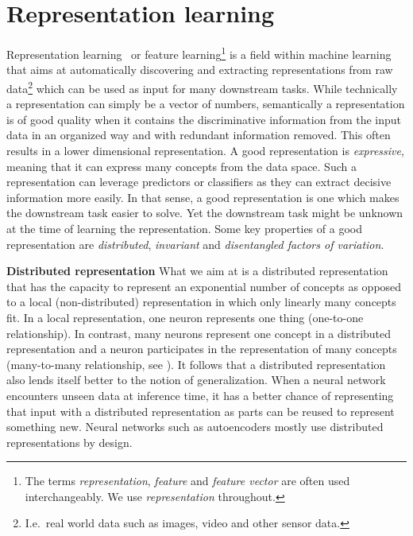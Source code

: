 \documentclass[a4paper,12pt]{report}
\begin{document}


\section{Representation learning}
Representation learning~\cite{ReprLearning} or feature learning\footnote{The terms \textit{representation}, \textit{feature} and \textit{feature vector} are often used interchangeably. We use \textit{representation} throughout.} is a field within machine learning that aims at automatically discovering and extracting representations from raw data\footnote{I.e.\ real world data such as images, video and other sensor data.} which can be used as input for many downstream tasks. While technically a representation can simply be a vector of numbers, semantically a representation is of good quality when it contains the discriminative information from the input data in an organized way and with redundant information removed. This often results in a lower dimensional representation. A good representation is \textit{expressive}, meaning that it can express many concepts from the data space. Such a representation can leverage predictors or classifiers as they can extract decisive information more easily. In that sense, a good representation is one which makes the downstream task easier to solve. Yet the downstream task might be unknown at the time of learning the representation. Some key properties of a good representation are \textit{distributed}, \textit{invariant} and \textit{disentangled factors of variation}.

\textbf{Distributed representation}
What we aim at is a distributed representation that has the capacity to represent an exponential number of concepts as opposed to a local (non-distributed) representation in which only linearly many concepts fit. In a local representation, one neuron represents one thing (one-to-one relationship). In contrast, many neurons represent one concept in a distributed representation and a neuron participates in the representation of many concepts (many-to-many relationship, see \cite{DistrRepHinton}). It follows that a distributed representation also lends itself better to the notion of generalization. When a neural network encounters unseen data at inference time, it has a better chance of representing that input with a distributed representation as parts can be reused to represent something new. Neural networks such as autoencoders mostly use distributed representations by design.
\end{document}

